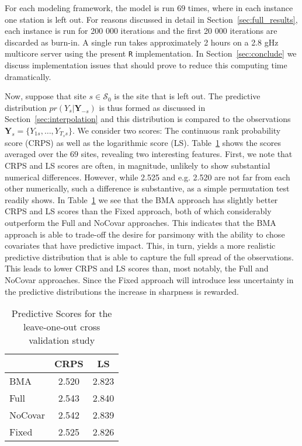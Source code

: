 \documentclass[11pt,english]{article}
\newcommand{\bs}[1]{\boldsymbol{#1}}
\newcommand{\mc}[1]{\mathcal{#1}}
\begin{document}
\indent For each modeling framework, the model is run $69$ times, where in each instance one station is left out.  For reasons discussed in detail in Section~\ref{sec:full_results}, each instance is run for 200 000 iterations and the first 20 000 iterations are discarded as burn-in.  A single run takes approximately 2 hours on a 2.8 gHz multicore server using the present {\tt R} implementation.  In Section~\ref{sec:conclude} we discuss implementation issues that should prove to reduce this computing time dramatically.

\indent Now, suppose that site $s\in\mc{S}_0$ is the site that is left out.  The predictive distribution $pr(Y_s|\bs{Y}_{-s})$ is thus formed as discussed in Section~\ref{sec:interpolation} and this distribution is compared to the observations $\bs{Y}_s = \{Y_{1s},\dots,Y_{T_ss}\}$.  We consider two scores: The continuous rank probability score (CRPS) as well as the logarithmic score (LS).  Table~\ref{tab:cv_scores} shows the scores averaged over the $69$ sites, revealing two interesting features.  First, we note that CRPS and LS scores are often, in magnitude, unlikely to show substantial numerical differences.  However, while 2.525 and e.g. 2.520 are not far from each other numerically, such a difference is substantive, as a simple permutation test \citep{good_1995} readily shows. In Table~\ref{tab:cv_scores} we see that the BMA approach has slightly better CRPS and LS scores than the Fixed approach, both of which considerably outperform the Full and NoCovar approaches.  This indicates that the BMA approach is able to trade-off the desire for parsimony with the ability to chose covariates that have predictive impact.  This, in turn, yields a more realistic predictive distribution that is able to capture the full spread of the observations.  This leads to lower CRPS and LS scores than, most notably, the Full and NoCovar approaches.  Since the Fixed approach will introduce less uncertainty in the predictive distributions the increase in sharpness is rewarded.\\

\begin{table}\caption{Predictive Scores for the leave-one-out cross validation study}\label{tab:cv_scores}
\begin{center}
\begin{tabular}{lcc}
\hline\hline
 & CRPS & LS\\
\hline
BMA & 2.520 & 2.823\\
Full & 2.543 & 2.840\\
NoCovar & 2.542 & 2.839\\
Fixed & 2.525 & 2.826\\
\hline\hline
\end{tabular}
\end{center}
\end{table}
\end{document}
